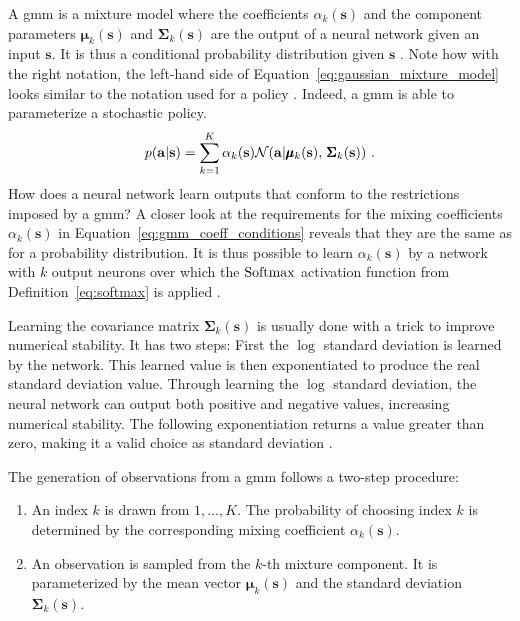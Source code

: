 A \gls{gmm} is a mixture model where the coefficients $\alpha_k (\mathbf s)$ and the component parameters $\pmb \mu_k (\mathbf s)$ and $\pmb \Sigma_k (\mathbf s)$ are the output of a neural network given an input $\mathbf s$. It is thus a conditional probability distribution given $\mathbf s$ \cite{bishopMixtureDensityNetworks1994}. Note how with the right notation, the left-hand side of Equation~\ref{eq:gaussian_mixture_model} looks similar to the notation used for a policy \p. Indeed, a \gls{gmm} is able to parameterize a stochastic policy.
\begin{gather}\label{eq:gaussian_mixture_model}
    p(\mathbf a | \mathbf s) = \sum_{k=1}^K \alpha_k (\mathbf s) \mathcal{N}(\mathbf a | \pmb \mu_k (\mathbf s), \, \pmb \Sigma_k (\mathbf s))~.
\end{gather}
How does a neural network learn outputs that conform to the restrictions imposed by a \gls{gmm}? A closer look at the requirements for the mixing coefficients $\alpha_k (\mathbf s)$ in Equation~\ref{eq:gmm_coeff_conditions} reveals that they are the same as for a probability distribution. It is thus possible to learn $\alpha_k (\mathbf s)$ by a network with $k$ output neurons over which the $\operatorname{Softmax}$ activation function from Definition~\ref{eq:softmax} is applied \cite{bishopPatternRecognitionMachine2006}.

Learning the covariance matrix $\pmb \Sigma_k (\mathbf s)$ is usually done with a trick to improve numerical stability. It has two steps: First the $\log$ standard deviation is learned by the network. This learned value is then exponentiated to produce the real standard deviation value. Through learning the $\log$ standard deviation, the neural network can output both positive and negative values, increasing numerical stability. The following exponentiation returns a value greater than zero, making it a valid choice as standard deviation \cite{schulmanTrustRegionPolicy2017}.

The generation of observations from a \gls{gmm} follows a two-step procedure:
\begin{enumerate}
    \item An index $k$ is drawn from $1, \ldots, K$. The probability of choosing index $k$ is determined by the corresponding mixing coefficient $\alpha_k (\mathbf s)$.
    \item An observation is sampled from the $k$-th mixture component. It is parameterized by the mean vector $\pmb \mu_k (\mathbf s)$ and the standard deviation $\pmb \Sigma_k (\mathbf s)$.
\end{enumerate}